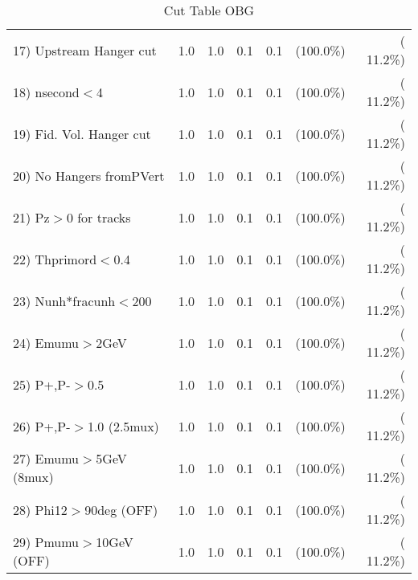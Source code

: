 \begin{table}[h!]
\begin{tabular}{||l||r|r|r|r|r|r||}
 17) Upstream Hanger cut  &          1.0 &          1.0 &          0.1 &          0.1 & (100.0\%) & ( 11.2\%) \\
 18) nsecond$<$4          &          1.0 &          1.0 &          0.1 &          0.1 & (100.0\%) & ( 11.2\%) \\
 19) Fid. Vol. Hanger cut &          1.0 &          1.0 &          0.1 &          0.1 & (100.0\%) & ( 11.2\%) \\
 20) No Hangers fromPVert &          1.0 &          1.0 &          0.1 &          0.1 & (100.0\%) & ( 11.2\%) \\
 21) Pz$>$0 for tracks    &          1.0 &          1.0 &          0.1 &          0.1 & (100.0\%) & ( 11.2\%) \\
 22) Thprimord$<$0.4      &          1.0 &          1.0 &          0.1 &          0.1 & (100.0\%) & ( 11.2\%) \\
 23) Nunh*fracunh$<$200   &          1.0 &          1.0 &          0.1 &          0.1 & (100.0\%) & ( 11.2\%) \\
 24) Emumu$>$2GeV         &          1.0 &          1.0 &          0.1 &          0.1 & (100.0\%) & ( 11.2\%) \\
 25) P+,P-$>$0.5          &          1.0 &          1.0 &          0.1 &          0.1 & (100.0\%) & ( 11.2\%) \\
 26) P+,P-$>$1.0 (2.5mux) &          1.0 &          1.0 &          0.1 &          0.1 & (100.0\%) & ( 11.2\%) \\
 27) Emumu$>$5GeV  (8mux) &          1.0 &          1.0 &          0.1 &          0.1 & (100.0\%) & ( 11.2\%) \\
 28) Phi12$>$90deg  (OFF) &          1.0 &          1.0 &          0.1 &          0.1 & (100.0\%) & ( 11.2\%) \\
 29) Pmumu$>$10GeV  (OFF) &          1.0 &          1.0 &          0.1 &          0.1 & (100.0\%) & ( 11.2\%) \\
 \hline
 \hline
 \end{tabular}
 \caption{Cut Table  OBG      }
 \label{tab-cutcohjpsi-mumu_qe}
 \end{table}
